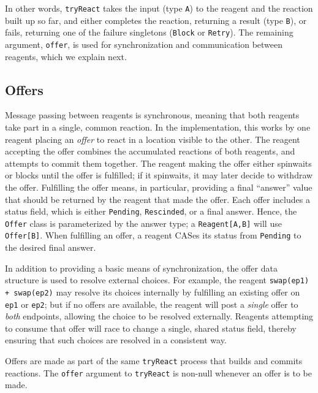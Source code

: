 \documentclass[preprint,nocopyrightspace]{sigplanconf}
\begin{document}
In other words, \lstinline{tryReact} takes the input (type \lstinline{A}) to
the reagent and the reaction built up so far, and either completes the
reaction, returning a result (type \lstinline{B}), or fails, returning one of
the failure singletons (\lstinline{Block} or \lstinline{Retry}).  The
remaining argument, \lstinline{offer}, is used for synchronization and
communication between reagents, which we explain next.

\subsection{Offers}
\label{sec:offers}

Message passing between reagents is synchronous, meaning that both reagents take
part in a single, common reaction.  In the implementation, this works by one
reagent placing an \emph{offer} to react in a location visible to the other.
The reagent accepting the offer combines the accumulated reactions of both
reagents, and attempts to commit them together.  The reagent making the offer
either spinwaits or blocks until the offer is fulfilled; if it spinwaits, it may
later decide to withdraw the offer.  Fulfilling the offer means, in particular,
providing a final ``answer'' value that should be returned by the reagent that
made the offer.  Each offer includes a status field, which is either
\lstinline{Pending}, \lstinline{Rescinded}, or a final answer.  Hence, the
\lstinline{Offer} class is parameterized by the answer type; a
\lstinline{Reagent[A,B]} will use \lstinline{Offer[B]}.  When fulfilling an
offer, a reagent CASes its status from \lstinline{Pending} to the desired final
answer.

In addition to providing a basic means of synchronization, the offer data
structure is used to resolve external choices.  For example, the reagent
\lstinline{swap(ep1) + swap(ep2)} may resolve its choices internally by
fulfilling an existing offer on \lstinline{ep1} or \lstinline{ep2}; but if no
offers are available, the reagent will post a \emph{single} offer to \emph{both}
endpoints, allowing the choice to be resolved externally.  Reagents attempting
to consume that offer will race to change a single, shared status field, thereby
ensuring that such choices are resolved in a consistent way.

Offers are made as part of the same \lstinline{tryReact} process that builds and
commits reactions.  The \lstinline{offer} argument to \lstinline{tryReact} is
non-null whenever an offer is to be made.
\end{document}
